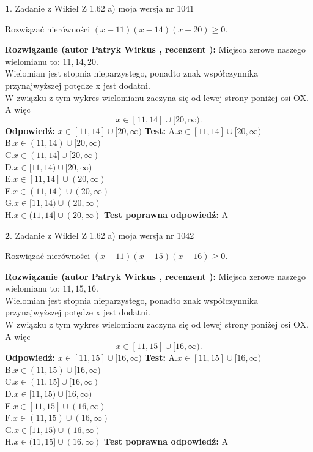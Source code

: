 \documentclass[12pt, a4paper]{article}
\theoremstyle{definition} %
\newtheorem{zad}{}
\newcommand{\zadStart}[1]{\begin{zad}#1\newline}
\newcommand{\zadStop}{\end{zad}}
\newcommand{\rozwStart}[2]{\noindent \textbf{Rozwiązanie (autor #1 , recenzent #2): }\newline}
\newcommand{\rozwStop}{\newline}
\newcommand{\odpStart}{\noindent \textbf{Odpowiedź:}\newline}
\newcommand{\odpStop}{\newline}
\newcommand{\testStart}{\noindent \textbf{Test:}\newline}
\newcommand{\testStop}{\newline}
\newcommand{\kluczStart}{\noindent \textbf{Test poprawna odpowiedź:}\newline}
\newcommand{\kluczStop}{\newline}
\begin{document}
\zadStart{Zadanie z Wikieł Z 1.62 a) moja wersja nr 1041}

Rozwiązać nierówności $(x-11)(x-14)(x-20)\ge0$.
\zadStop
\rozwStart{Patryk Wirkus}{}
Miejsca zerowe naszego wielomianu to: $11, 14, 20$.\\
Wielomian jest stopnia nieparzystego, ponadto znak współczynnika przy\linebreak najwyższej potędze x jest dodatni.\\ W związku z tym wykres wielomianu zaczyna się od lewej strony poniżej osi OX. A więc $$x \in [11,14] \cup [20,\infty).$$
\rozwStop
\odpStart
$x \in [11,14] \cup [20,\infty)$
\odpStop
\testStart
A.$x \in [11,14] \cup [20,\infty)$\\
B.$x \in (11,14) \cup [20,\infty)$\\
C.$x \in (11,14] \cup [20,\infty)$\\
D.$x \in [11,14) \cup [20,\infty)$\\
E.$x \in [11,14] \cup (20,\infty)$\\
F.$x \in (11,14) \cup (20,\infty)$\\
G.$x \in [11,14) \cup (20,\infty)$\\
H.$x \in (11,14] \cup (20,\infty)$
\testStop
\kluczStart
A
\kluczStop



\zadStart{Zadanie z Wikieł Z 1.62 a) moja wersja nr 1042}

Rozwiązać nierówności $(x-11)(x-15)(x-16)\ge0$.
\zadStop
\rozwStart{Patryk Wirkus}{}
Miejsca zerowe naszego wielomianu to: $11, 15, 16$.\\
Wielomian jest stopnia nieparzystego, ponadto znak współczynnika przy\linebreak najwyższej potędze x jest dodatni.\\ W związku z tym wykres wielomianu zaczyna się od lewej strony poniżej osi OX. A więc $$x \in [11,15] \cup [16,\infty).$$
\rozwStop
\odpStart
$x \in [11,15] \cup [16,\infty)$
\odpStop
\testStart
A.$x \in [11,15] \cup [16,\infty)$\\
B.$x \in (11,15) \cup [16,\infty)$\\
C.$x \in (11,15] \cup [16,\infty)$\\
D.$x \in [11,15) \cup [16,\infty)$\\
E.$x \in [11,15] \cup (16,\infty)$\\
F.$x \in (11,15) \cup (16,\infty)$\\
G.$x \in [11,15) \cup (16,\infty)$\\
H.$x \in (11,15] \cup (16,\infty)$
\testStop
\kluczStart
A
\kluczStop
\end{document}
